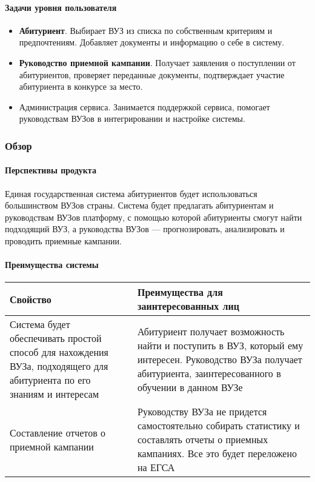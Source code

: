 \documentclass[a4paper, 14pt]{extarticle}
\begin{document}
\paragraph*{Задачи уровня пользователя}

\begin{itemize}[leftmargin=*]
  \item \textbf{Абитуриент}. Выбирает ВУЗ из списка по собственным критериям и
  предпочтениям. Добавляет документы и информацию о себе в систему.
  \item \textbf{Руководство приемной кампании}. Получает заявления о поступлении
  от абитуриентов, проверяет переданные документы, подтверждает участие
  абитуриента в конкурсе за место.
  \item Администрация сервиса. Занимается поддержкой сервиса, помогает
  руководствам ВУЗов в интегрировании и настройке системы.
\end{itemize}

\subsubsection*{Обзор}

\paragraph*{Перспективы продукта}

Единая государственная система абитуриентов будет использоваться большинством
ВУЗов страны. Система будет предлагать абитуриентам и руководствам ВУЗов
платформу, с помощью которой абитуриенты смогут найти подходящий ВУЗ, а
руководства ВУЗов --- прогнозировать, анализировать и проводить приемные
кампании.

\paragraph*{Преимущества системы}

\begin{longtable}{|L{0.47\textwidth}|L{0.47\textwidth}|}
  \hline
  \textbf{Свойство}                       &
  \textbf{Преимущества для заинтересованных лиц} \\
  \hline
  Система будет обеспечивать простой способ для нахождения ВУЗа, подходящего для
  абитуриента по его знаниям и интересам  &
  Абитуриент получает возможность найти и поступить в ВУЗ, который ему
  интересен. Руководство ВУЗа получает абитуриента, заинтересованного в обучении
  в данном ВУЗе                                  \\
  \hline
  Составление отчетов о приемной кампании &
  Руководству ВУЗа не придется
  самостоятельно собирать статистику и составлять отчеты о приемных кампаниях.
  Все это будет переложено на ЕГСА               \\
  \hline
\end{longtable}
\end{document}

